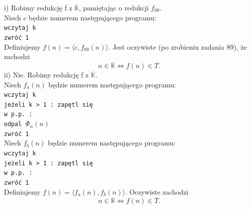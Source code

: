 \documentclass[a4paper,11pt]{article}
\newenvironment{zadanie}[1]
  {\renewcommand\theinnercustomthm{#1}\innercustomthm}
  {\endinnercustomthm}
\begin{document}
\begin{zadanie}{99}
\end{zadanie}
i) Robimy redukcję f z $\overline{\mathbb{K}}$, pamiętając o redukcji $f_{89}$. \\
Niech $c$ będzie numerem następującego programu: \\
\texttt{wczytaj k  \\ zwróć 1 \\}
Definiujemy $f(n) = \langle c , f_{89}(n) \rangle$. Jest oczywiste (po zrobieniu zadania $89$), że zachodzi \\
$$
n \in \overline{\mathbb{K}} \Longleftrightarrow f(n) \in T.
$$
ii) Nie. Robimy redukcję f z $\overline{\mathbb{K}}$. \\
Niech $f_a(n)$ będzie numerem następującego programu: \\
\texttt{wczytaj k \\ jeżeli k > 1 : zapętl się  \\ w p.p. : \\ odpal $\Phi_n(n)$ \\ zwróć 1 \\}
Niech $f_b(n)$ będzie numerem następującego programu: \\
\texttt{wczytaj k \\ jeżeli k > 1 : zapętl się  \\ w p.p. : \\ zwróć 1 \\}
Definiujemy $f(n) = \langle f_a(n) , f_b(n) \rangle$. Oczywiste zachodzi \\
$$
n \in \overline{\mathbb{K}} \Longleftrightarrow f(n) \in \overline{T}.
$$
\end{document}
